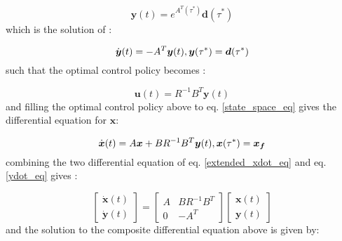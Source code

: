 \documentclass{article}%
\begin{document}
            \begin{equation} \label{y_sym_eq}
            \boldsymbol{y}(t) = e^{A^{T}(\tau^{*})}\boldsymbol{d}(\tau^{*})
            \end{equation}
            which is the solution of :

            \begin{equation} \label{ydot_eq}
            \\\dot{\boldsymbol{y}}(t) = -A^{T}\boldsymbol{y}(t),
            \\\boldsymbol{y}(\tau^{*}) = \boldsymbol{d}(\tau^{*})
            \end{equation}
            such that the optimal control policy becomes :

            \begin{equation} \label{ut_eq}
            \boldsymbol{u}(t) = R^{-1}B^{T}\boldsymbol{y}(t)
            \end{equation}
            and filling the optimal control policy above to eq. \ref{state_space_eq} gives the differential equation for $\boldsymbol{x}$:

            \begin{equation} \label{extended_xdot_eq}
            \\\dot{\boldsymbol{x}}(t) = A\boldsymbol{x}+BR^{-1}B^{T}\boldsymbol{y}(t), \\\boldsymbol{x}(\tau^{*})=\boldsymbol{x_f}
            \end{equation}
            combining the two differential equation of eq. \ref{extended_xdot_eq} and eq. \ref{ydot_eq} gives :

            \begin{equation} \label{composite_derivative_eq}
            \begin{bmatrix}
            \dot{\boldsymbol{x}}(t)\\
            \dot{\boldsymbol{y}}(t)
            \end{bmatrix}
            =
            \begin{bmatrix}
            A & BR^{-1}B^{T}\\
            0 & -A^{T}
            \end{bmatrix}
            \begin{bmatrix}
            \boldsymbol{x}(t) \\
            \boldsymbol{y}(t)
            \end{bmatrix}
            \end{equation}
            and the solution to the composite differential equation above is given by:
\end{document}
